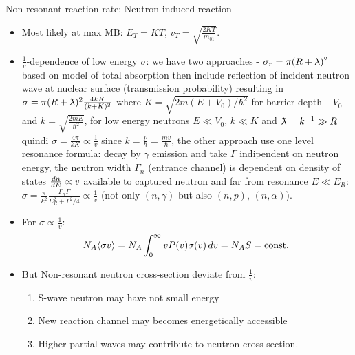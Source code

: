 \begin{frame}{Non-resonant reaction rate: Neutron induced reaction}
    \begin{itemize}
        \item Most likely at max MB: $E_T=KT$, $v_T=\sqrt{\frac{2KT}{m_{01}}}$.
        \item $\frac{1}{v}$-dependence of low energy $\sigma$: we have two approaches - $\sigma_r=\pi(R+\lambdabar)^2$ based on model of total absorption then include reflection of incident neutron wave at nuclear surface (transmission probability) resulting in $\sigma=\pi(R+\lambdabar)^2 \frac{4kK}{(k+K)^2}$ where $K=\sqrt{2m(E+V_0)/\hbar^2}$ for barrier depth $-V_0$ and $k=\sqrt{\frac{2mE}{\hbar^2}}$, for low energy neutrons $E\ll V_0$, $k\ll K$ and $\lambdabar=\invers{k}\gg R$ quindi $\sigma=\frac{4\pi}{kK}\propto \frac{1}{v}$ since $k=\frac{p}{\hbar}=\frac{mv}{\hbar}$, the other approach use one level resonance formula: decay by $\gamma$ emission and take $\Gamma$ indipendent on neutron energy, the neutron width $\Gamma_n$ (entrance channel) is dependent on density of states $\TDy{E}{n}\propto v$ available to captured neutron and far from resonance $E\ll E_R$: $\sigma=\frac{\pi}{k^2}\frac{\Gamma_n\Gamma}{E_R^2+\Gamma^2/4}\propto \frac{1}{v}$ (not only $(n,\gamma)$ but also $(n,p)$, $(n,\alpha)$).
        \item For $\sigma\propto \frac{1}{v}$:
            \begin{equation*}
                N_A\exv{\sigma v}=N_A\int_0^{\infty}vP(v)\sigma(v)\,dv=N_AS=\const{}
            \end{equation*}
        \item But Non-resonant neutron cross-section deviate from $\frac{1}{v}$:
            \begin{enumerate}
                \item S-wave neutron may have not small energy
                \item New reaction channel may becomes energetically accessible
                \item Higher partial waves may contribute to neutron cross-section.
            \end{enumerate}
    \end{itemize}
\end{frame}

